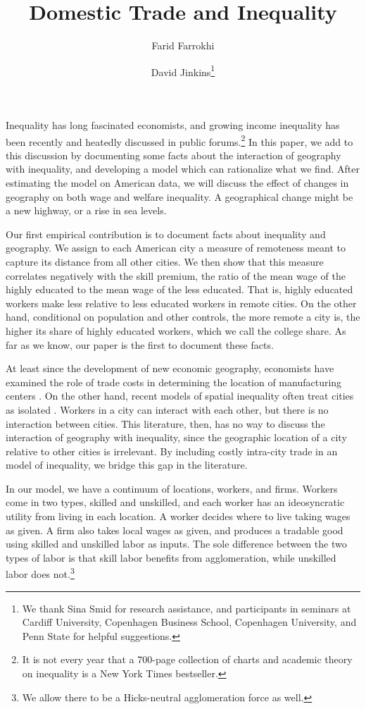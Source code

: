\documentclass{article}
\title{Domestic Trade and Inequality}
\author[1]{Farid Farrokhi}
\author[2]{David Jinkins\thanks{We thank Sina Smid for research assistance, and participants in seminars at Cardiff University, Copenhagen Business School, Copenhagen University, and Penn State for helpful suggestions.}}
\affil[1]{Penn State}
\affil[2]{Copenhagen Business School}
\begin{document}
\maketitle

Inequality has long fascinated economists, and growing income inequality has been recently and heatedly discussed in public forums.\footnote{It is not every year that a 700-page collection of charts and academic theory on inequality is a New York Times bestseller.}  In this paper, we add to this discussion by documenting some facts about the interaction of geography with inequality, and developing a model which can rationalize what we find.  After estimating the model on American data, we will discuss the effect of changes in geography on both wage and welfare inequality.  A geographical change might be a new highway, or a rise in sea levels.

Our first empirical contribution is to document facts about inequality and geography.  We assign to each American city a measure of remoteness meant to capture its distance from all other cities.  We then show that this measure correlates negatively with the skill premium, the ratio of the mean wage of the highly educated to the mean wage of the less educated.  That is, highly educated workers make less relative to less educated workers in remote cities.  On the other hand, conditional on population and other controls, the more remote a city is, the higher its share of highly educated workers, which we call the college share.  As far as we know, our paper is the first to document these facts.

At least since the development of new economic geography, economists have examined the role of trade costs in determining the location of manufacturing centers \citep{krugman1991increasing}.  On the other hand, recent models of spatial inequality often treat cities as isolated \citep{davis2014comparative}.  Workers in a city can interact with each other, but there is no interaction between cities. This literature, then, has no way to discuss the interaction of geography with inequality, since the geographic location of a city relative to other cities is irrelevant.  By including costly intra-city trade in an model of inequality, we bridge this gap in the literature.

In our model, we have a continuum of locations, workers, and firms.  Workers come in two types, skilled and unskilled, and each worker has an ideosyncratic utility from living in each location.  A worker decides where to live taking wages as given.  A firm also takes local wages as given, and produces a tradable good using skilled and unskilled labor as inputs.  The sole difference between the two types of labor is that skill labor benefits from agglomeration, while unskilled labor does not.\footnote{We allow there to be a Hicks-neutral agglomeration force as well.}
\end{document}
